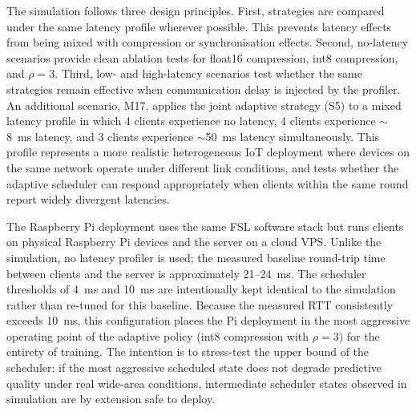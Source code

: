 \documentclass[conference]{IEEEtran}
\begin{document}
\begin{table}[H]
\centering
\caption{Simulation scenario matrix.}
\label{tab:native_simulation_matrix}
\end{table}

The simulation follows three design principles. First, strategies are compared under the same latency profile wherever possible. This prevents latency effects from being mixed with compression or synchronisation effects. Second, no-latency scenarios provide clean ablation tests for float16 compression, int8 compression, and $\rho{=}3$. Third, low- and high-latency scenarios test whether the same strategies remain effective when communication delay is injected by the profiler. An additional scenario, M17, applies the joint adaptive strategy (S5) to a mixed latency profile in which 4 clients experience no latency, 4 clients experience $\sim$8~ms latency, and 3 clients experience $\sim$50~ms latency simultaneously. This profile represents a more realistic heterogeneous IoT deployment where devices on the same network operate under different link conditions, and tests whether the adaptive scheduler can respond appropriately when clients within the same round report widely divergent latencies.

The Raspberry Pi deployment uses the same FSL software stack but runs clients on physical Raspberry Pi devices and the server on a cloud VPS. Unlike the simulation, no latency profiler is used; the measured baseline round-trip time between clients and the server is approximately 21--24~ms. The scheduler thresholds of 4~ms and 10~ms are intentionally kept identical to the simulation rather than re-tuned for this baseline. Because the measured RTT consistently exceeds 10~ms, this configuration places the Pi deployment in the most aggressive operating point of the adaptive policy (int8 compression with $\rho{=}3$) for the entirety of training. The intention is to stress-test the upper bound of the scheduler: if the most aggressive scheduled state does not degrade predictive quality under real wide-area conditions, intermediate scheduler states observed in simulation are by extension safe to deploy.
\end{document}
